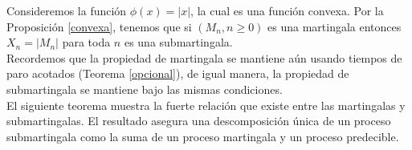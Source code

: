 Consideremos la función $\phi(x) = |x|$, la cual es una función convexa. Por la Proposición \ref{convexa}, tenemos que si $(M_n, n \geq 0)$ es una martingala entonces $X_n = |M_n|$ para toda $n$ es una submartingala. \\

Recordemos que la propiedad de martingala se mantiene aún usando tiempos de paro acotados (Teorema \ref{opcional}), de igual manera, la propiedad de submartingala se mantiene bajo las mismas condiciones. \\

El siguiente teorema muestra la fuerte relación que existe entre las martingalas y submartingalas. El resultado asegura una descomposición única de un proceso submartingala como la suma de un proceso martingala y un proceso predecible.

